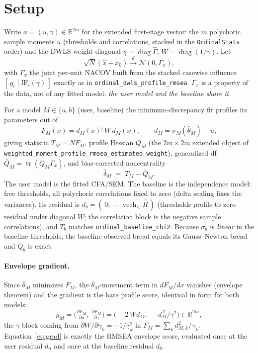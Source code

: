 \documentclass[11pt]{article}
\newcommand{\tr}{\operatorname{tr}}
\newcommand{\dto}{\xrightarrow{d}}
\theoremstyle{plain}
\theoremstyle{remark}
\begin{document}
\section{Setup}\label{sec:setup}

Write $x=(u,\gamma)\in\mathbb R^{2m}$ for the extended first-stage vector: the
$m$ polychoric sample moments $u$ (thresholds and correlations, stacked in the
\texttt{OrdinalStats} order) and the DWLS weight diagonal $\gamma=\operatorname{diag}\hat\Gamma$,
$W=\operatorname{diag}(1/\gamma)$. Let
\[
  \sqrt N(\hat x-x_0)\dto\mathcal N(0,\Gamma_x),
\]
with $\Gamma_x$ the joint per-unit NACOV built from the stacked casewise
influence $[\,g_i\mid \mathrm{IF}_i(\gamma)\,]$ exactly as in
\texttt{ordinal\_dwls\_profile\_rmsea}. $\Gamma_x$ is a property of the data, not
of any fitted model: \emph{the user model and the baseline share it.}

For a model $M\in\{u,b\}$ (user, baseline) the minimum-discrepancy fit profiles
its parameters out of
\[
  F_M(x)=d_M(x)'\,W\,d_M(x),\qquad d_M=\sigma_M(\hat\theta_M)-u,
\]
giving statistic $T_M=N F_M$, profile Hessian $Q_M$ (the
$2m\times2m$ extended object of \texttt{weighted\_moment\_profile\_rmsea\_estimated\_weight}),
generalized df $\bar Q_M=\tr(Q_M\Gamma_x)$, and bias-corrected noncentrality
\begin{equation}\label{eq:delta}
  \hat\delta_M \;=\; T_M-\bar Q_M.
\end{equation}
The user model is the fitted CFA/SEM. The baseline is the independence model:
free thresholds, all polychoric correlations fixed to zero (delta scaling fixes
the variances). Its residual is $d_b=(\,0;\,-\operatorname{vech}_{<}\hat R\,)$
(thresholds profile to zero residual under diagonal $W$; the correlation block
is the negative sample correlations), and $T_b$ matches
\texttt{ordinal\_baseline\_chi2}. Because $\sigma_b$ is \emph{linear} in the
baseline thresholds, the baseline observed bread equals its Gauss--Newton bread
and $Q_b$ is exact.

\paragraph{Envelope gradient.} Since $\hat\theta_M$ minimizes $F_M$, the
$\hat\theta_M$-movement term in $dF_M/dx$ vanishes (envelope theorem) and the
gradient is the bare profile score, identical in form for both models:
\begin{equation}\label{eq:grad}
  g_M=\Big(\tfrac{\partial F_M}{\partial u},\ \tfrac{\partial F_M}{\partial\gamma}\Big)
     =\big(-2\,W d_M,\ -d_M^{\,2}/\gamma^{2}\big)\in\mathbb R^{2m},
\end{equation}
the $\gamma$ block coming from $\partial W/\partial\gamma_k=-1/\gamma_k^2$ in
$F_M=\sum_k d_{M,k}^2/\gamma_k$. Equation~\eqref{eq:grad} is exactly the RMSEA
envelope score, evaluated once at the user residual $d_u$ and once at the
baseline residual $d_b$.
\end{document}
